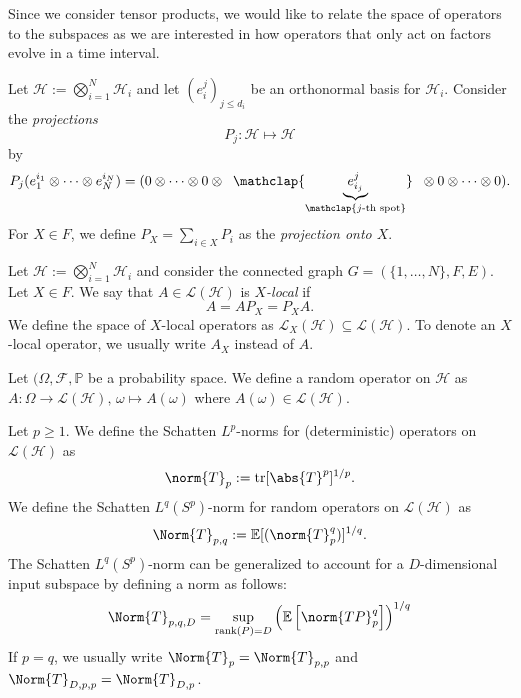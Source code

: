 Since we consider tensor products, we would like to relate the space of operators to the subspaces as we are interested in how operators that only act on factors evolve in a time interval.


\begin{lem}
    Let \(\mathcal{H}:= \bigotimes_{i=1}^{N} \mathcal{H}_i\) and let \((e^{j}_i)_{j \leq d_i}\) be an orthonormal basis for \(\mathcal{H}_i\). Consider the \emph{projections} 
    \[P_j: \mathcal{H} \mapsto \mathcal{H} \] by \[P_j(e^{i_1}_{1} \otimes \dots \otimes e^{i_N}_{N}) = (0 \otimes \dots \otimes 0 \otimes \;\;\mathclap{\underbrace{e^{j}_{i_j}}_{\mathclap{j \text{-th spot}}}} \;\;\otimes 0 \otimes  \dots \otimes 0).\]
    For \(X \in F\), we define \(P_X = \sum_{i\in X}^{} P_i \) as the \emph{projection onto \(X\)}.
  \end{lem}


\begin{defn}
  Let \(\mathcal{H}:= \bigotimes_{i=1}^{N}\mathcal{H}_i\) and consider the connected graph \(G=(\{1,\dots,N\}, F, E)\). Let \(X \in F\). We say that \(A \in \mathcal{L}(\mathcal{H})\) is \emph{ \(X\)-local} if 
  \[A = AP_X = P_XA.\]
  We define the space of \(X\)-local operators as \(\mathcal{L}_X(\mathcal{H})\subseteq \mathcal{L}(\mathcal{H})\). To denote an \(X\)-local operator, we usually write \(A_X\) instead of \(A\).
\end{defn}


\begin{defn}
    Let \((\Omega , \mathcal{F}, \mathbb{P}\) be a probability space. We define a random operator on \(\mathcal{H}\) as
    \(A: \Omega \to \mathcal{L}(\mathcal{H}),\, \omega \mapsto A(\omega)\)
    where \(A(\omega) \in \mathcal{L}(\mathcal{H})\).
\end{defn}


\begin{defn}
    Let \(p\geq 1\). We define the Schatten \(L^{p}\)-norms for (deterministic) operators on \(\mathcal{L}(\mathcal{H})\) as
      \[\norm{T}_{p}:= \operatorname{tr}[ \abs{T}^{p}]^{1/p} .\]
   We define the Schatten \(L^{q}(S^{p})\)-norm for random operators on \(\mathcal{L}(\mathcal{H})\) as 
   \[\Norm{T}_{p,q}:= \mathbb{E}[ (\norm{T}_{p}^{q})]^{1/q}.\]
   The Schatten \(L^{q}(S^{p})\)-norm can be generalized to account for a \(D\)-dimensional input subspace by defining a norm as follows:
   \[\Norm{T}_{p,q,D}= \sup_{ \operatorname{rank}(P)=D} \left(\mathbb{E} \left[ \norm{TP}_{p}^{q}\right]\right)^{1/q}  \]
   If \(p=q\), we usually write \(\Norm{T}_{p}=\Norm{T}_{p,p}\) and \(\Norm{T}_{D,p,p}=\Norm{T}_{D,p}\). 
\end{defn}


